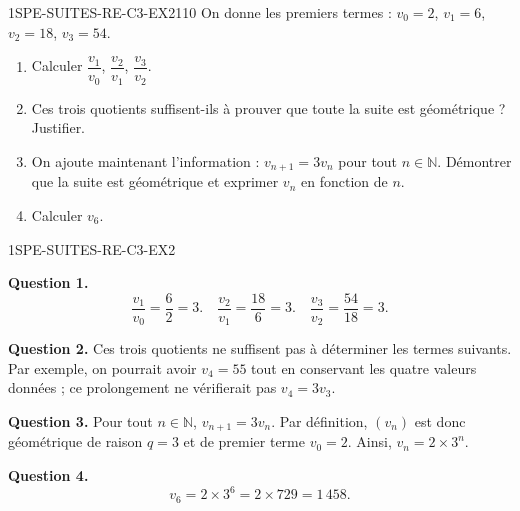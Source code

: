 
\begin{exercice}{1SPE-SUITES-RE-C3-EX2}{1}{10}
On donne les premiers termes : $v_0 = 2$, $v_1 = 6$, $v_2 = 18$, $v_3 = 54$.
\begin{enumerate}
  \item Calculer $\dfrac{v_1}{v_0}$, $\dfrac{v_2}{v_1}$, $\dfrac{v_3}{v_2}$.
  \item Ces trois quotients suffisent-ils à prouver que toute la suite est
  géométrique ? Justifier.
  \item On ajoute maintenant l'information : $v_{n+1}=3v_n$ pour tout
  $n\in\mathbb{N}$. Démontrer que la suite est géométrique et exprimer $v_n$
  en fonction de $n$.
  \item Calculer $v_6$.
\end{enumerate}
\end{exercice}


\begin{corrige}{1SPE-SUITES-RE-C3-EX2}

\textbf{Question 1.}
\[
\frac{v_1}{v_0} = \frac{6}{2} = 3. \quad \frac{v_2}{v_1} = \frac{18}{6} = 3. \quad \frac{v_3}{v_2} = \frac{54}{18} = 3.
\]


\textbf{Question 2.} Ces trois quotients ne suffisent pas à déterminer les
termes suivants. Par exemple, on pourrait avoir $v_4=55$ tout en conservant les
quatre valeurs données ; ce prolongement ne vérifierait pas $v_4=3v_3$.


\textbf{Question 3.} Pour tout $n\in\mathbb{N}$, $v_{n+1}=3v_n$. Par
définition, $(v_n)$ est donc géométrique de raison $q=3$ et de premier terme
$v_0=2$. Ainsi, $v_n=2\times3^n$.

\textbf{Question 4.}
\[
v_6 = 2 \times 3^6 = 2 \times 729 = 1\,458.
\]

\end{corrige}


